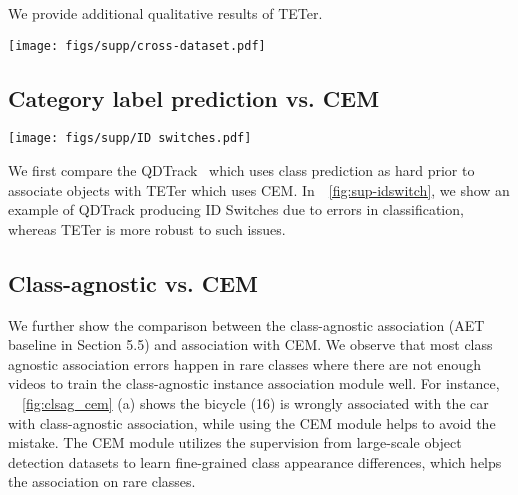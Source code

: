 \documentclass[runningheads]{llncs}
\begin{document}
We provide additional qualitative results of TETer.


\begin{figure*}[t]
	\centering
\texttt{[image: figs/supp/cross-dataset.pdf]}
	\vspace{-0.12in}
	\caption{Qualitative comparison of tracker optimized for the TAO~\cite{tao} metric (top) and tracker optimized for TETA (bottom) on BDD100K. The tracker optimized for TAO produces more false positives}
	\label{fig:sup-crossdataset}
\end{figure*}


\subsection{Category label prediction vs. CEM}

\begin{figure*}[t]
	\centering
\texttt{[image: figs/supp/ID switches.pdf]}
	\vspace{-0.12in}
 	\caption{Qualitative comparison of QDTrack~\cite{qdtrack} (top) and TETer (bottom) on BDD100K. QDTrack has ID Switches due to classification errors. (Same color represent the same track)}
	\label{fig:sup-idswitch}
\end{figure*}

We first compare the QDTrack~\cite{qdtrack} which uses class prediction as hard prior to associate objects with TETer which uses CEM.
In~\figurename~\ref{fig:sup-idswitch}, we show an example of QDTrack producing ID Switches due to errors in classification, whereas TETer is more robust to such issues.


\subsection{Class-agnostic vs. CEM}
We further show the comparison between the class-agnostic association (AET baseline in Section 5.5) and association with CEM. We observe that most class agnostic association errors happen in rare classes where there are not enough videos to train the class-agnostic instance association module well. For instance, ~\figurename~\ref{fig:clsag_cem} (a) shows the bicycle (16) is wrongly associated with the car with class-agnostic association, while using the CEM module helps to avoid the mistake.
The CEM module utilizes the supervision from large-scale object detection datasets to learn fine-grained class appearance differences, which helps the association on rare classes.
\end{document}
